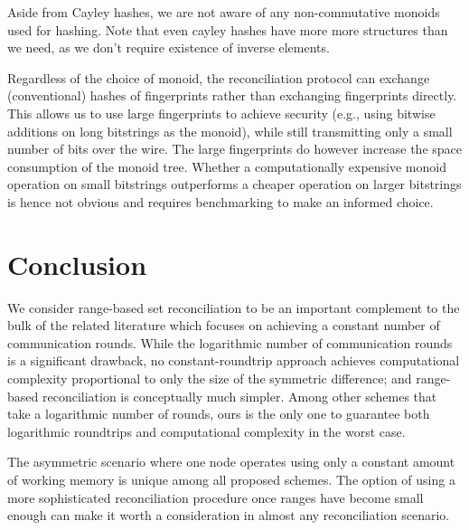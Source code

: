 \documentclass[conference]{IEEEtran}
\begin{document}

Aside from Cayley hashes, we are not aware of any non-commutative monoids used for hashing. Note that even cayley hashes have more more structures than we need, as we don't require existence of inverse elements.

Regardless of the choice of monoid, the reconciliation protocol can exchange (conventional) hashes of fingerprints rather than exchanging fingerprints directly. This allows us to use large fingerprints to achieve security (e.g., using bitwise additions on long bitstrings as the monoid), while still transmitting only a small number of bits over the wire. The large fingerprints do however increase the space consumption of the monoid tree. Whether a computationally expensive monoid operation on small bitstrings outperforms a cheaper operation on larger bitstrings is hence not obvious and requires benchmarking to make an informed choice.

\section{Conclusion}\label{conclusion}

We consider range-based set reconciliation to be an important complement to the bulk of the related literature which focuses on achieving a constant number of communication rounds. While the logarithmic number of communication rounds is a significant drawback, no constant-roundtrip approach achieves computational complexity proportional to only the size of the symmetric difference; and range-based reconciliation is conceptually much simpler. Among other schemes that take a logarithmic number of rounds, ours is the only one to guarantee both logarithmic roundtrips and computational complexity in the worst case.

The asymmetric scenario where one node operates using only a constant amount of working memory is unique among all proposed schemes. The option of using a more sophisticated reconciliation procedure once ranges have become small enough can make it worth a consideration in almost any reconciliation scenario.
\end{document}
